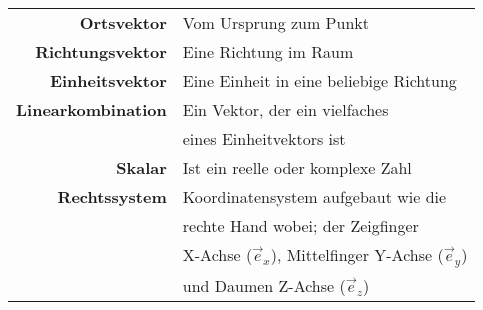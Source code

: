 \begin{tabular}{r|l}
    \textbf{Ortsvektor}         & Vom Ursprung zum Punkt \\
    \textbf{Richtungsvektor}    & Eine Richtung im Raum \\
    \textbf{Einheitsvektor}     & Eine Einheit in eine beliebige Richtung \\
    \textbf{Linearkombination}  & Ein Vektor, der ein vielfaches \\
                                & eines Einheitvektors ist \\
    \textbf{Skalar}             & Ist ein reelle oder komplexe Zahl \\
    \textbf{Rechtssystem}       & Koordinatensystem aufgebaut wie die \\
                                & rechte Hand wobei; der Zeigfinger \\
                                & X-Achse ($\vec{e}_x$), Mittelfinger Y-Achse ($\vec{e}_y$) \\
                                & und Daumen Z-Achse ($\vec{e}_z$)
\end{tabular}